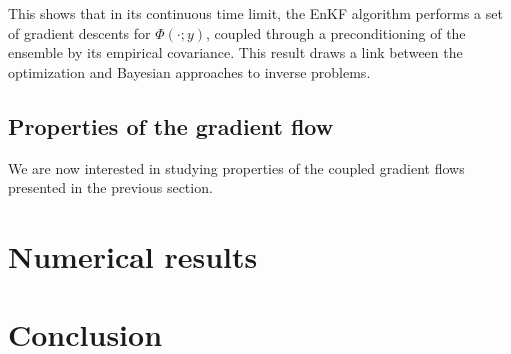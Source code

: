 \documentclass[a4paper,twocolumn,10pt]{article}
\begin{document}
This shows that in its continuous time limit, the EnKF algorithm performs a set of gradient descents
for $\Phi(\cdot; y)$, coupled through a preconditioning of the ensemble by its empirical covariance. This
result draws a link between the optimization and Bayesian approaches to inverse problems.

\subsection{Properties of the gradient flow} \label{subsec:3:2}

We are now interested in studying properties of the coupled gradient flows presented
in the previous section.

\section{Numerical results} \label{sec:4}

\section{Conclusion} \label{sec:5}



\end{document}
